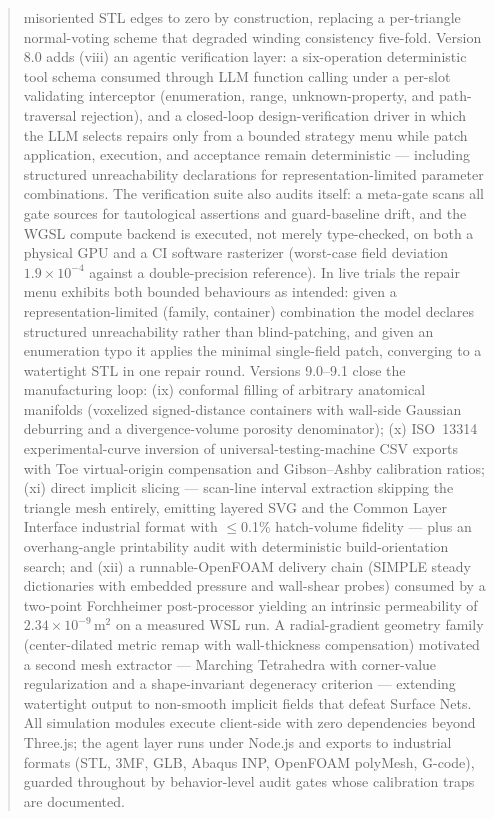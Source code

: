 \documentclass[5p,times,authoryear]{elsarticle}
\begin{document}
\begin{frontmatter}
\begin{abstract}
misoriented STL edges to zero by construction, replacing a per-triangle normal-voting scheme that
degraded winding consistency five-fold. Version 8.0 adds (viii) an agentic verification layer:
a six-operation deterministic tool schema consumed through LLM function calling under a per-slot
validating interceptor (enumeration, range, unknown-property, and path-traversal rejection), and a
closed-loop design-verification driver in which the LLM selects repairs only from a bounded
strategy menu while patch application, execution, and acceptance remain deterministic --- including
structured unreachability declarations for representation-limited parameter combinations. The
verification suite also audits itself: a meta-gate scans all gate sources for tautological
assertions and guard-baseline drift, and the WGSL compute backend is executed, not merely
type-checked, on both a physical GPU and a CI software rasterizer (worst-case field deviation
$1.9\times10^{-4}$ against a double-precision reference). In live trials the repair menu exhibits
both bounded behaviours as intended: given a representation-limited (family, container)
combination the model declares structured unreachability rather than blind-patching, and given an
enumeration typo it applies the minimal single-field patch, converging to a watertight STL in one
repair round.
Versions 9.0--9.1 close the manufacturing loop: (ix) conformal filling of arbitrary
anatomical manifolds (voxelized signed-distance containers with wall-side Gaussian
deburring and a divergence-volume porosity denominator); (x) ISO~13314 experimental-curve
inversion of universal-testing-machine CSV exports with Toe virtual-origin compensation and
Gibson--Ashby calibration ratios; (xi) direct implicit slicing --- scan-line interval
extraction skipping the triangle mesh entirely, emitting layered SVG and the Common Layer
Interface industrial format with $\le$0.1\% hatch-volume fidelity --- plus an overhang-angle
printability audit with deterministic build-orientation search; and (xii) a runnable-OpenFOAM
delivery chain (SIMPLE steady dictionaries with embedded pressure and wall-shear probes)
consumed by a two-point Forchheimer post-processor yielding an intrinsic permeability of
$2.34\times10^{-9}\,$m$^2$ on a measured WSL run. A radial-gradient geometry family
(center-dilated metric remap with wall-thickness compensation) motivated a second mesh
extractor --- Marching Tetrahedra with corner-value regularization and a shape-invariant
degeneracy criterion --- extending watertight output to non-smooth implicit fields that
defeat Surface Nets.
All simulation modules execute client-side with zero dependencies beyond Three.js; the agent
layer runs under Node.js and exports to industrial formats (STL, 3MF, GLB, Abaqus INP,
OpenFOAM polyMesh, G-code), guarded throughout by behavior-level audit gates whose
calibration traps are documented.
\end{abstract}


\end{frontmatter}
\end{document}

